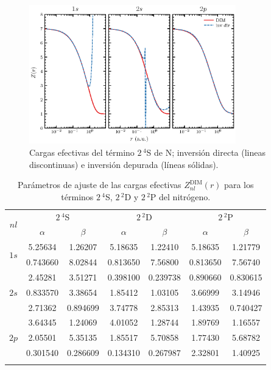 \begin{figure}
\centering
\includegraphics[width=0.8\textwidth]{figures/dim/nitro_dim.eps}
\caption[Cargas efectivas DIM de nitrógeno.]
{Cargas efectivas del término $2\,^4$S de N; 
inversión directa (lineas discontinuas) 
e inversión depurada (líneas sólidas).}
\label{fig:Nzeff}
\end{figure}

\begin{table}
\centering
\begin{tabular}{ccccccc}
\hline
\multirow{2}{*}{$nl$} 
  & \multicolumn{2}{c}{$2\,^4$S} 
  & \multicolumn{2}{c}{$2\,^2$D } 
  & \multicolumn{2}{c}{$2\,^2$P} \\
\arrayrulecolor{gray!30!white}
       & $\alpha$ & $\beta$ 
       & $\alpha$ & $\beta$ 
       & $\alpha$ & $\beta$ \\
\hline
\multirow{2}{*}{$1s$} & 5.25634  & 1.26207 
       & 5.18635  & 1.22410
       & 5.18635 & 1.21779  \\
\vspace*{0.09cm}
       & 0.743660 & 8.02844 
       & 0.813650 & 7.56800
       & 0.813650 & 7.56740   \\
\hline
\multirow{3}{*}{$2s$} & 2.45281  & 3.51271 
       & 0.398100 & 0.239738
       & 0.890660 & 0.830615  \\
       & 0.833570  & 3.38654 
       & 1.85412  & 1.03105
       & 3.66999  & 3.14946   \\
\vspace*{0.09cm}
       & 2.71362  & 0.894699 
       & 3.74778  & 2.85313
       & 1.43935  & 0.740427  \\
\hline
\multirow{3}{*}{$2p$}  & 3.64345  & 1.24069 
       & 4.01052  & 1.28744
       & 1.89769  & 1.16557  \\
       & 2.05501  & 5.35135 
       & 1.85517  & 5.70858 
       & 1.77430   & 5.68782 \\
       & 0.301540 & 0.286609 
       & 0.134310  & 0.267987
       & 2.32801  & 1.40925  \\
\arrayrulecolor{black}\hline
\end{tabular}
\caption[Parámetros de ajuste de cargas efectivas de nitrógeno.]
{Parámetros de ajuste de las cargas efectivas 
$Z_{nl}^{\mathrm{DIM}}(r)$ para los términos $2\,^4$S, $2\,^2$D y
$2\,^2$P del nitrógeno.}
\label{tab:parametersNitro}
\end{table}

